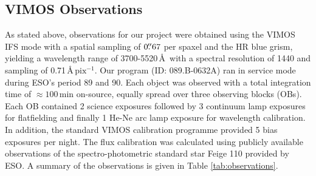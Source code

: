 	\subsection{VIMOS Observations}
		As stated above, observations for our project were obtained using the VIMOS IFS mode with a spatial sampling of $0\hbox{$.\!\!^{\prime\prime}$}67$ per spaxel and the HR blue grism, yielding a wavelength range of 3700-5520\,\AA\ with a spectral resolution of 1440 and sampling of 0.71\,\AA\,$\mathrm{pix^{-1}}$. Our program (ID: 089.B-0632A) ran in service mode during ESO's period 89 and 90. Each object was observed with a total integration time of $\approx 100$\,min on-source, equally spread over three observing blocks (OBs). Each OB contained 2 science exposures followed by 3 continuum lamp exposures for flatfielding and finally 1 He-Ne arc lamp exposure for wavelength calibration. In addition, the standard VIMOS calibration programme provided 5 bias exposures per night. The flux calibration was calculated using publicly available observations of the spectro-photometric standard star Feige 110 provided by ESO. A summary of the observations is given in Table \ref{tab:observations}.


